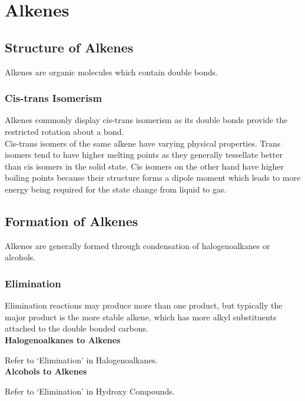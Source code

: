 \documentclass[../main]{subfiles}
\begin{document}
\section{Alkenes}

	\subsection{Structure of Alkenes}

	Alkenes are organic molecules which contain  double bonds.

	\subsubsection{Cis-trans Isomerism}

	Alkenes commonly display cis-trans isomerism as its  double bonds provide the restricted rotation about a bond. \\

	Cis-trans isomers of the same alkene have varying physical properties. Trans isomers tend to have higher melting points as they generally tessellate better than cis isomers in the solid state. Cis isomers on the other hand have higher boiling points because their structure forms a dipole moment which leads to more energy being required for the state change from liquid to gas.

	\subsection{Formation of Alkenes}

	Alkenes are generally formed through condensation of halogenoalkanes or alcohols.

	\subsubsection{Elimination}

	Elimination reactions may produce more than one product, but typically the major product is the more stable alkene, which has more alkyl substituents attached to the double bonded carbons. \\

	\noindent \textbf{Halogenoalkanes to Alkenes}

	Refer to `Elimination' in Halogenoalkanes. \\

	\noindent \textbf{Alcohols to Alkenes} 

	Refer to `Elimination' in Hydroxy Compounds. \\
\end{document}
